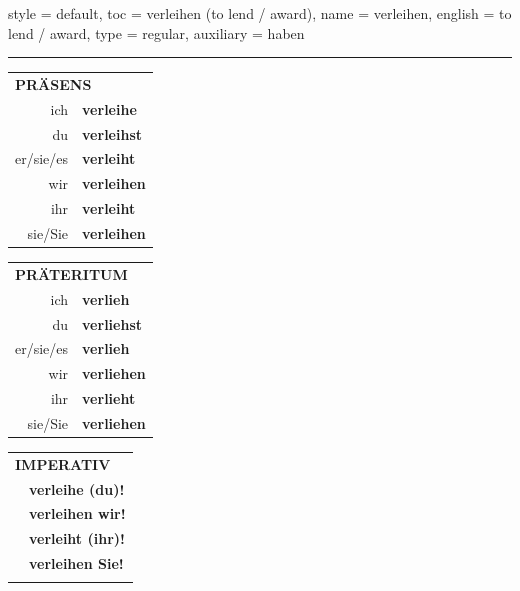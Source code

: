 \begin{verbentry}{
  style = {default},
  toc = {verleihen (to lend / award)},
  name = {verleihen},
  english = {to lend / award},
  type = {regular},
  auxiliary = {haben}
}
 
    
     \vspace{5pt}

    \hrule
    
    \vspace{5pt}

  \begin{tabular}{rl}
     \multicolumn{2}{l}{\textbf{PRÄSENS} }\\
    ich & \textbf{verleihe}\\
    du & \textbf{verleihst}\\
    er/sie/es & \textbf{verleiht}\\
    wir & \textbf{verleihen}\\
    ihr & \textbf{verleiht}\\
    sie/Sie & \textbf{verleihen}\\
  \end{tabular}
  \hfill
  \begin{tabular}{rl}
    \multicolumn{2}{l}{\textbf{PRÄTERITUM} }\\
    ich & \textbf{verlieh}\\
    du & \textbf{verliehst}\\
    er/sie/es & \textbf{verlieh}\\
    wir & \textbf{verliehen}\\
    ihr & \textbf{verlieht}\\
    sie/Sie & \textbf{verliehen}\\
  \end{tabular}
  \hfill
  \begin{tabular}{rl}
     \multicolumn{2}{l}{\textbf{IMPERATIV} }\\
   & \textbf{verleihe (du)!}\\
   & \textbf{verleihen wir!}\\
   & \textbf{verleiht (ihr)!}\\
   & \textbf{verleihen Sie!}\\
   & \vspace{10pt}
  \end{tabular}

 \vspace{10pt}


\end{verbentry}
